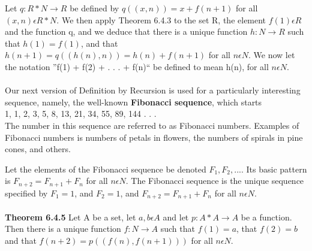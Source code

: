 \documentclass[a4paper,english,12pt]{article}
\begin{document}
Let $q : R * N \rightarrow R$ be defined by $q((x, n)) = x + f (n + 1)$ for all $(x, n) \epsilon R * N$. We then apply Theorem 6.4.3 to the set R, the element $f(1)\epsilon R$ and the function q, and we deduce that there is a unique function $h : N \rightarrow R$ such that $h(1) = f(1)$, and that $h(n + 1) = q((h(n), n)) = h(n) + f (n + 1)$ for all $n\epsilon N$. We now let the notation ''f(1) + f(2) + . . . + f(n)`` be defined to mean h(n), for all $n\epsilon N$.
\\
\\
Our next version of Definition by Recursion is used for a particularly interesting sequence, namely, the well-known {\bf Fibonacci sequence}, which starts \\1, 1, 2, 3, 5, 8, 13, 21, 34, 55, 89, 144 . . .\\ The number in this sequence are referred to as Fibonacci numbers. Examples of Fibonacci numbers is numbers of petals in flowers, the numbers of spirals in pine cones, and others.

Let the elements of the Fibonacci sequence be denoted $F_1, F_2, . . . .$ Its basic pattern is $F_{n+2}=F_{n+1}+F_n$ for all $n\epsilon N$. The Fibonacci sequence is the unique sequence specified by $F_1=1$, and $F_2=1$, and $F_{n+2}=F_{n+1}+F_n$ for all $n\epsilon N$.
\\\\
{\bf Theorem 6.4.5} Let A be a set, let $a, b \epsilon A$ and let $p : A * A \rightarrow A$ be a function. Then there is a unique function $f : N \rightarrow A$ such that $f (1) = a$, that $f (2) = b$ and that $f (n + 2) = p(( f (n), f (n + 1)))$ for all $n \epsilon N$. 
\end{document}
